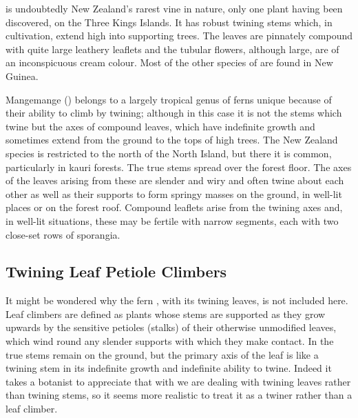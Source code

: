  is undoubtedly New Zealand's rarest vine in nature, only one plant having been discovered, on the Three Kings Islands.
It has robust twining stems which, in cultivation, extend high into supporting trees.
The leaves are pinnately compound with quite large leathery leaflets and the tubular flowers, although large, are of an inconspicuous cream colour.
Most of the other species of  are found in New Guinea.

Mangemange () belongs to a largely tropical genus of ferns unique because of their ability to climb by twining; although in this case it is not the stems which twine but the axes of compound leaves, which have indefinite growth and sometimes extend from the ground to the tops of high trees.
The New Zealand species is restricted to the north of the North Island, but there it is common, particularly in kauri forests.
The true stems spread over the forest floor.
The axes of the leaves arising from these are slender and wiry and often twine about each other as well as their supports to form springy masses on the ground, in well-lit places or on the forest roof.
Compound leaflets arise from the twining axes and, in well-lit situations, these may be fertile with narrow segments, each with two close-set rows of sporangia.

\subsection{Twining Leaf Petiole Climbers}

It might be wondered why the fern , with its twining leaves, is not included here.
Leaf climbers are defined as plants whose stems are supported as they grow upwards by the sensitive petioles (stalks) of their otherwise unmodified leaves, which wind round any slender supports with which they make contact.
In  the true stems remain on the ground, but the primary axis of the leaf is like a twining stem in its indefinite growth and indefinite ability to twine.
Indeed it takes a botanist to appreciate that with  we are dealing with twining leaves rather than twining stems, so it seems more realistic to treat it as a twiner rather than a leaf climber.

